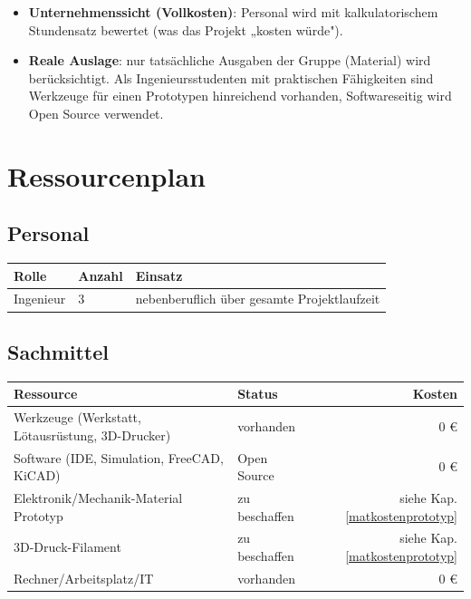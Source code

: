 \documentclass[
  a4paper,
  12pt,
  DIV=12,        %
  parskip=half,  %
  headings=small %
]{scrartcl}
\theoremstyle{definition}
\theoremstyle{definition}
\begin{document}
\begin{itemize}
\item \textbf{Unternehmenssicht (Vollkosten)}: Personal wird mit kalkulatorischem Stundensatz bewertet (was das Projekt „kosten würde").
\item \textbf{Reale Auslage}: nur tatsächliche Ausgaben der Gruppe (Material) wird berücksichtigt. Als Ingenieursstudenten mit praktischen Fähigkeiten sind Werkzeuge für einen Prototypen hinreichend vorhanden, Softwareseitig wird Open Source verwendet. 
\end{itemize}




\section{Ressourcenplan}

\subsection{Personal}

\begin{tabularx}{\textwidth}{llX@{}}
\toprule
\textbf{Rolle} & \textbf{Anzahl} & \textbf{Einsatz} \\
\midrule
Ingenieur & 3 & nebenberuflich über gesamte Projektlaufzeit \\
\bottomrule
\end{tabularx}



\subsection{Sachmittel}


\begin{tabularx}{\textwidth}{X@{}lr}
\toprule
\textbf{Ressource} & \textbf{Status} & \textbf{Kosten} \\
\midrule
Werkzeuge (Werkstatt, Lötausrüstung, 3D-Drucker) & vorhanden & 0 \euro \\
Software (IDE, Simulation, FreeCAD, KiCAD) & Open Source & 0 \euro \\
Elektronik/Mechanik-Material Prototyp & zu beschaffen & siehe Kap.  \ref{matkostenprototyp} \\
3D-Druck-Filament & zu beschaffen & siehe Kap.  \ref{matkostenprototyp} \\
Rechner/Arbeitsplatz/IT & vorhanden & 0 \euro \\
\bottomrule
\end{tabularx}
\end{document}
